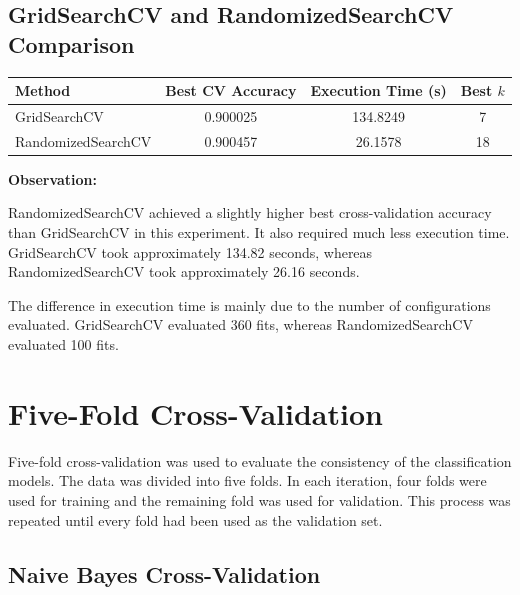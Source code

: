 \documentclass[12pt,a4paper]{article}
\begin{document}
\subsection{GridSearchCV and RandomizedSearchCV Comparison}

\begin{longtable}{|p{4cm}|c|c|c|}
\hline
\textbf{Method} &
\textbf{Best CV Accuracy} &
\textbf{Execution Time (s)} &
\textbf{Best $k$} \\ \hline

GridSearchCV &
0.900025 &
134.8249 &
7 \\ \hline

RandomizedSearchCV &
0.900457 &
26.1578 &
18 \\ \hline

\end{longtable}

\textbf{Observation:}

RandomizedSearchCV achieved a slightly higher best cross-validation
accuracy than GridSearchCV in this experiment. It also required much
less execution time. GridSearchCV took approximately 134.82 seconds,
whereas RandomizedSearchCV took approximately 26.16 seconds.

The difference in execution time is mainly due to the number of
configurations evaluated. GridSearchCV evaluated 360 fits, whereas
RandomizedSearchCV evaluated 100 fits.


\section{Five-Fold Cross-Validation}

Five-fold cross-validation was used to evaluate the consistency of the
classification models. The data was divided into five folds. In each
iteration, four folds were used for training and the remaining fold
was used for validation. This process was repeated until every fold
had been used as the validation set.


\subsection{Naive Bayes Cross-Validation}
\end{document}
